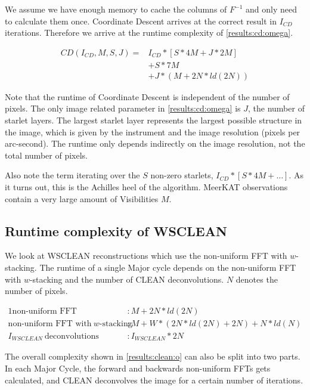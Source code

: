 We assume we have enough memory to cache the columns of $F^{-1}$ and only need to calculate them once. Coordinate Descent arrives at the correct result in $I_{CD}$ iterations. Therefore we arrive at the runtime complexity of \eqref{results:cd:omega}.

\begin{equation}\label{results:cd:omega}
\begin{aligned}
	CD(I_{CD}, M, S, J) = &I_{CD} * [S * 4M + J * 2M]\\
		&+  S*7M\\
		&+ J*(M + 2N*ld(2N))
\end{aligned}
\end{equation}

Note that the runtime of Coordinate Descent is independent of the number of pixels. The only image related parameter in \eqref{results:cd:omega} is $J$, the number of starlet layers. The largest starlet layer represents the largest possible structure in the image, which is given by the instrument and the image resolution (pixels per arc-second). The runtime only depends indirectly on the image resolution, not the total number of pixels.

Also note the term iterating over the $S$ non-zero starlets, $ I_{CD} * [S * 4M +\ldots]$. As it turns out, this is the Achilles heel of the algorithm. MeerKAT observations contain a very large amount of Visibilities $M$.

\subsection{Runtime complexity of WSCLEAN}
We look at WSCLEAN reconstructions which use the non-uniform FFT with $w$-stacking. The runtime of a single Major cycle depends on the non-uniform FFT with $w$-stacking and the number of CLEAN deconvolutions. $N$ denotes the number of pixels.

\begin{alignat*}{1}
	\text{non-uniform FFT} &: M + 2N*ld(2N)\\
	\text{non-uniform FFT with} \:w\text{-stacking} &:M + W*(2N*ld(2N) + 2N) + N*ld(N)\\
	I_{WSCLEAN}\: \text{deconvolutions} &: I_{WSCLEAN}*2N
\end{alignat*}

The overall complexity shown in \eqref{results:clean:o} can also be split into two parts. In each Major Cycle, the forward and backwards non-uniform FFTs gets calculated, and CLEAN deconvolves the image for a certain number of iterations.

